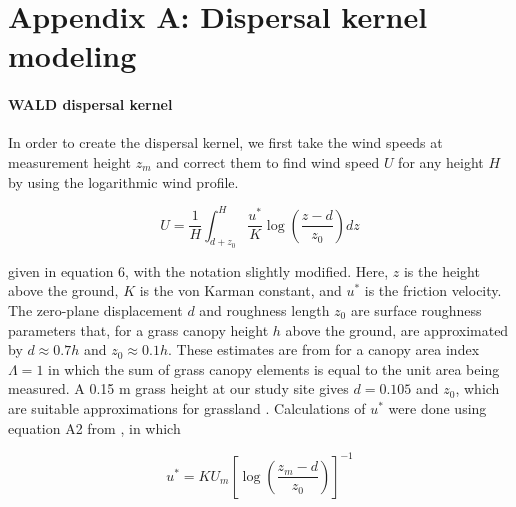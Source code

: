 \documentclass[11pt]{article}\usepackage[]{graphicx}\usepackage[usenames,dvipsnames]{xcolor}
\begin{document}



\newpage
\section*{Appendix A: Dispersal kernel modeling}
\renewcommand{\thefigure}{A\arabic{figure}}\setcounter{figure}{0}
\renewcommand{\thetable}{A\arabic{table}}\setcounter{table}{0}
\renewcommand{\theequation}{A\arabic{equation}}\setcounter{equation}{0}

\paragraph{WALD dispersal kernel}
In order to create the dispersal kernel, we first take the wind speeds at measurement height $z_{m}$ and correct them to find wind speed $U$ for any height $H$ by using the logarithmic wind profile.

\begin{linenomath*} \begin{equation} U = \frac{1}{H} \int_{d+z_{0}}^{H} \frac{u^*}{K} \log \left(\frac{z-d}{z_{0}}\right) dz \end{equation} 
\end{linenomath*} 

given in \citet{bullock2012modelling} equation 6, with the notation slightly modified. 
Here, $z$ is the height above the ground, $K$ is the von Karman constant, and $u^*$ is the friction velocity.
The zero-plane displacement $d$ and roughness length $z_{0}$ are surface roughness parameters that, for a grass canopy height $h$ above the ground, are  approximated by $d \approx 0.7h$ and $z_{0} \approx 0.1h$.
These estimates are from \citet{raupach1994simplified} for a canopy area index $\Lambda = 1$ in which the sum of grass canopy elements is equal to the unit area being measured.
A 0.15 m grass height at our study site gives $d = 0.105$ and $z_{0}$, which are suitable approximations for grassland \citep{wiernga1993representative}.
Calculations of $u^*$ were done using equation A2 from \citet{skarpaas2007dispersal}, in which 

\begin{linenomath*} \begin{equation} u^* = KU_{m} \left[\log\left(\frac{z_{m} - d}{z_{0}}\right)\right]^{-1} \end{equation} 
\end{linenomath*} 
\end{document}
